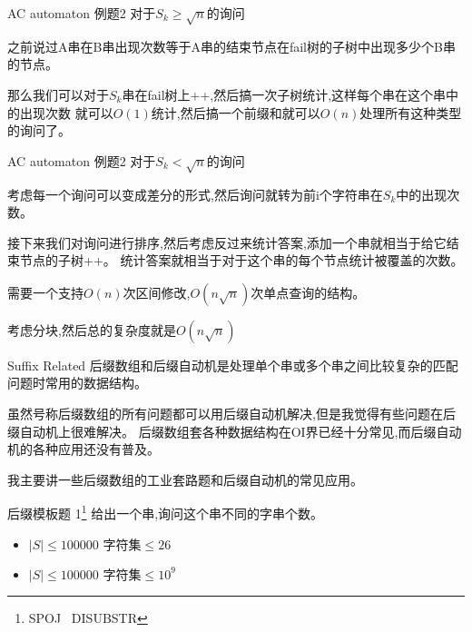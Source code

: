 \documentclass[10pt]{beamer}
\begin{document}
	\begin{frame}{AC automaton 例题2}
		对于$S_k \geq \sqrt{n}$的询问

		\vspace{3ex}

		之前说过A串在B串出现次数等于A串的结束节点在fail树的子树中出现多少个B串的节点。\pause

		\vspace{2ex}

		那么我们可以对于$S_k$串在fail树上++,然后搞一次子树统计,这样每个串在这个串中的出现次数
		就可以$O(1)$统计,然后搞一个前缀和就可以$O(n)$处理所有这种类型的询问了。
	\end{frame}
	\begin{frame}{AC automaton 例题2}
		对于$S_k < \sqrt{n}$的询问

		\vspace{3ex}

		考虑每一个询问可以变成差分的形式,然后询问就转为前i个字符串在$S_k$中的出现次数。\pause

		\vspace{2ex}

		接下来我们对询问进行排序,然后考虑反过来统计答案,添加一个串就相当于给它结束节点的子树++。
		统计答案就相当于对于这个串的每个节点统计被覆盖的次数。\pause

		需要一个支持$O(n)$次区间修改,$O(n\sqrt{n})$次单点查询的结构。

		考虑分块,然后总的复杂度就是$O(n\sqrt{n})$

	\end{frame}
	\begin{frame}{Suffix Related}
		后缀数组和后缀自动机是处理单个串或多个串之间比较复杂的匹配问题时常用的数据结构。\pause

		\vspace{2ex}

		虽然号称后缀数组的所有问题都可以用后缀自动机解决,但是我觉得有些问题在后缀自动机上很难解决。
		后缀数组套各种数据结构在OI界已经十分常见,而后缀自动机的各种应用还没有普及。\pause
	
		\vspace{2ex}

		我主要讲一些后缀数组的工业套路题和后缀自动机的常见应用。
	\end{frame}
	\begin{frame}{后缀模板题 1\footnote{SPOJ $\,$ DISUBSTR}}
		给出一个串,询问这个串不同的字串个数。
		\vspace{2ex}
		\begin{itemize}
			\item $|S| \leq 100000 \,\,\text{字符集} \leq 26$
			\item $|S| \leq 100000 \,\,\text{字符集} \leq 10^9$
		\end{itemize}
	\end{frame}
\end{document}
